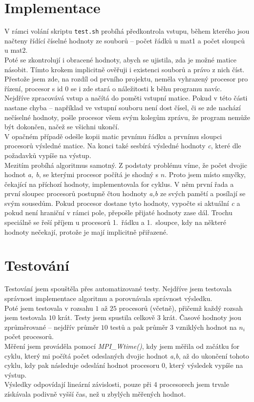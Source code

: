 \documentclass[11pt]{article}
\begin{document}
\section{Implementace}
V rámci volání skriptu \texttt{test.sh} probíhá předkontrola vstupu, během kterého jsou načteny řídící číselné hodnoty ze souborů 
-- počet řádků u mat1 a počet sloupců u mat2.\\
Poté se zkontrolují i obracené hodnoty, abych se ujistila, zda je možné matice násobit. Tímto krokem implicitně ověřuji i existenci souborů
a právo z nich číst.\\
Přestože jsem zde, na rozdíl od prvního projektu, neměla vyhrazený procesor pro řízení, procesor s id 0 se i zde
stará o náležitosti k běhu programu navíc.\\
Nejdříve zpracovává vstup a načítá do poměti vstupní matice.
Pokud v této části nastane chyba -- například ve vstupní souboru není dost čísel, či se zde nachází nečíselné hodnoty, pošle
procesor všem svým kolegům zprávu, že program nemůže být dokončen, načež se všichni ukončí.\\
V opačném případě odešle kopii matic prvnímu řádku a prvnímu sloupci procesorů výsledné matice.
Na konci také sesbírá výsledné hodnoty \textit{c}, které dle požadavků vypíše na výstup. \\
Mezitím probíhá algoritmus samotný. Z podstaty problému víme, že počet dvojic hodnot \textit{a, b}, se kterými procesor počítá je shodný s $n$.
Proto jsem místo smyčky, čekající na příchozí hodnoty, implementovala for cyklus. V něm první řada a první sloupec procesorů
postupně čtou hodnoty \textit{a,b} ze svých pamětí a posílají se svým sousedům. Pokud procesor dostane tyto hodnoty, vypočte si aktuální 
\textit{c} a pokud není hraniční v rámci pole, přepošle přijaté hodnoty zase dál.
Trochu speciálně se řeší příjem u procesorů 1.\ řádku a 1.\ sloupce, kdy na některé hodnoty nečekají, protože je mají implicitně přiřazené.

\section{Testování}
Testování jsem spouštěla přes automatizované testy.
Nejdříve jsem testovala správnost implementace algoritmu a porovnávala správnost výsledku.\\
Poté jsem testovala v rozsahu $1$ až $25$ procesorů (včetně), přičemž každý rozsah jsem testovala $10$ krát.
Testy jsem spustila celkově $3$ krát.
Časové hodnoty jsou zprůměrované -- nejdřív průměr $10$ testů a pak průměr $3$ vzniklých hodnot na $n_i$ počet procesorů.\\
Měření jsem prováděla pomocí \textit{MPI\_Wtime()}, kdy jsem měřila od začátku for cyklu, který mi počítá počet odeslaných dvojic hodnot
\textit{a,b}, až do ukončení tohoto cyklu, kdy pak následuje odeslání hodnot procesoru $0$, který výsledek vypíše na výstup.\\
Výsledky odpovídají lineární závislosti, pouze při 4 procesorech jsem trvale získávala podivně vyšší čas, než u zbylých
měřených hodnot.
\end{document}
